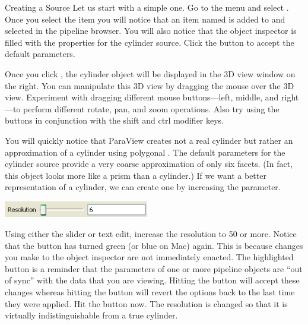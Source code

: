 \begin{exercise}{Creating a Source}
  \label{ex:CreatingASource}%
  Let us start with a simple one.  Go to the  menu and select
  .  Once you select the  item you will notice
  that an item named  is added to and selected in the
  pipeline browser.  You will also notice that the object inspector is
  filled with the properties for the cylinder source.  Click the
   button \apply to accept the default parameters.

  Once you click , the cylinder object will be displayed in the
  3D view window on the right.  You can manipulate this 3D view by dragging
  the mouse over the 3D view.  Experiment with dragging different mouse
  buttons---left, middle, and right---to perform different rotate, pan, and
  zoom operations.  Also try using the buttons in conjunction with the
  shift and ctrl modifier keys.

  You will quickly notice that ParaView creates not a real cylinder but
  rather an approximation of a cylinder using polygonal .
  The default parameters for the cylinder source provide a very coarse
  approximation of only six facets. (In fact, this object looks more like a
  prism than a cylinder.) If we want a better representation of a cylinder,
  we can create one by increasing the  parameter.

  \begin{inlinefig}
    \includegraphics[width=2.5in]{images/ResolutionParameter}
  \end{inlinefig}

  Using either the slider or text edit, increase the resolution to 50 or
  more.  Notice that the  button \apply has turned green (or
  blue on Mac) again.  This is because changes you make to the object
  inspector are not immediately enacted.  The highlighted button is a
  reminder that the parameters of one or more pipeline objects are ``out of
  sync'' with the data that you are viewing.  Hitting the  button
  will accept these changes whereas hitting the  button \reset
  will revert the options back to the last time they were applied.  Hit the
   button now.  The resolution is changed so that it is
  virtually indistinguishable from a true cylinder.
\end{exercise}

